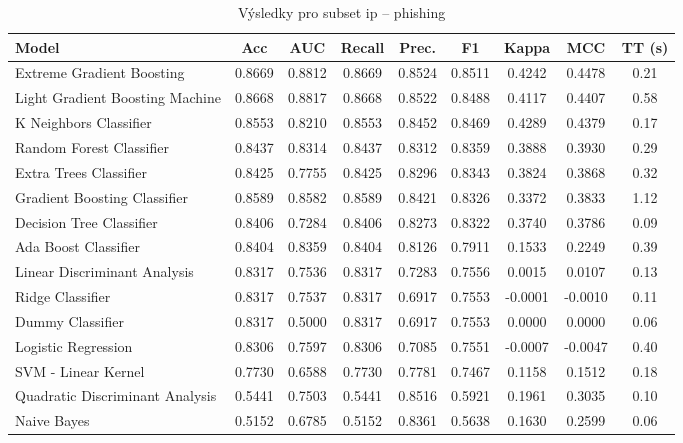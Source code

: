 \begin{table}[H]
  \centering
  \small
  \caption{Výsledky pro subset ip – phishing}
  \begin{tabular}{|l|c|c|c|c|c|c|c|c|}
    \hline
    \textbf{Model} & \textbf{Acc} & \textbf{AUC} & \textbf{Recall} & \textbf{Prec.} & \textbf{F1} & \textbf{Kappa} & \textbf{MCC} & \textbf{TT (s)} \\
    \hline
    Extreme Gradient Boosting & 0.8669 & 0.8812 & 0.8669 & 0.8524 & 0.8511 & 0.4242 & 0.4478 & 0.21 \\
    Light Gradient Boosting Machine & 0.8668 & 0.8817 & 0.8668 & 0.8522 & 0.8488 & 0.4117 & 0.4407 & 0.58 \\
    K Neighbors Classifier & 0.8553 & 0.8210 & 0.8553 & 0.8452 & 0.8469 & 0.4289 & 0.4379 & 0.17 \\
    Random Forest Classifier & 0.8437 & 0.8314 & 0.8437 & 0.8312 & 0.8359 & 0.3888 & 0.3930 & 0.29 \\
    Extra Trees Classifier & 0.8425 & 0.7755 & 0.8425 & 0.8296 & 0.8343 & 0.3824 & 0.3868 & 0.32 \\
    Gradient Boosting Classifier & 0.8589 & 0.8582 & 0.8589 & 0.8421 & 0.8326 & 0.3372 & 0.3833 & 1.12 \\
    Decision Tree Classifier & 0.8406 & 0.7284 & 0.8406 & 0.8273 & 0.8322 & 0.3740 & 0.3786 & 0.09 \\
    Ada Boost Classifier & 0.8404 & 0.8359 & 0.8404 & 0.8126 & 0.7911 & 0.1533 & 0.2249 & 0.39 \\
    Linear Discriminant Analysis & 0.8317 & 0.7536 & 0.8317 & 0.7283 & 0.7556 & 0.0015 & 0.0107 & 0.13 \\
    Ridge Classifier & 0.8317 & 0.7537 & 0.8317 & 0.6917 & 0.7553 & -0.0001 & -0.0010 & 0.11 \\
    Dummy Classifier & 0.8317 & 0.5000 & 0.8317 & 0.6917 & 0.7553 & 0.0000 & 0.0000 & 0.06 \\
    Logistic Regression & 0.8306 & 0.7597 & 0.8306 & 0.7085 & 0.7551 & -0.0007 & -0.0047 & 0.40 \\
    SVM - Linear Kernel & 0.7730 & 0.6588 & 0.7730 & 0.7781 & 0.7467 & 0.1158 & 0.1512 & 0.18 \\
    Quadratic Discriminant Analysis & 0.5441 & 0.7503 & 0.5441 & 0.8516 & 0.5921 & 0.1961 & 0.3035 & 0.10 \\
    Naive Bayes & 0.5152 & 0.6785 & 0.5152 & 0.8361 & 0.5638 & 0.1630 & 0.2599 & 0.06 \\
    \hline
  \end{tabular}
\end{table}
\vspace{0.5cm}

